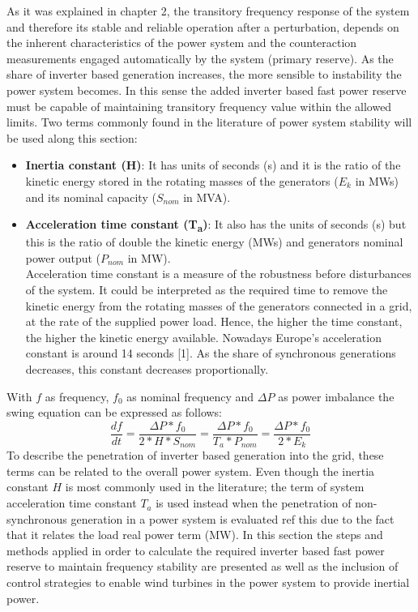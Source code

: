 As it was explained in chapter 2, the transitory frequency response of the system and therefore its stable and reliable operation after a perturbation, depends on the inherent characteristics of the power system and the counteraction measurements engaged automatically by the system (primary reserve). As the share of inverter based generation increases, the more sensible to instability the power system becomes. In this sense the added inverter based fast power reserve must be capable of maintaining transitory frequency value within the allowed limits. 
Two terms commonly found in the literature of power system stability will be used along this section:

\begin{itemize}[leftmargin=*,labelsep=5.8mm]
	\item \textbf{Inertia constant (H)}: It has units of seconds (s) and it is the ratio of the kinetic energy stored in the rotating masses of the generators ($E_k$ in MWs) and its nominal capacity ($S_{nom}$ in MVA).\\
	\item \textbf{Acceleration time constant (T\textsubscript{a})}: It also has the units of seconds (s) but this is the ratio of double the kinetic energy (MWs) and generators nominal power output ($P_{nom}$ in MW).\\
	 Acceleration time constant is a measure of the robustness before disturbances of the system. It could be interpreted as the required time to remove the kinetic energy from the rotating masses of the generators connected in a grid, at the rate of the supplied power load. Hence, the higher the time constant, the higher the kinetic energy available. Nowadays Europe’s acceleration constant is around 14 seconds [1]. As the share of synchronous generations decreases, this constant decreases proportionally.
\end{itemize}

With $f$ as frequency, $f_0$ as nominal frequency and $\Delta P$ as power imbalance the swing equation can be expressed as follows:
\begin{equation}
	\label{eq:swing}
	\frac{df}{dt}=\dfrac{\Delta P*f_0}{2*H*S_{nom}}=\frac{\Delta P*f_0}{T_a*P_{nom}}=\frac{\Delta P*f_0}{2*E_k}
\end{equation}
To describe the penetration of inverter based generation into the grid, these terms can be related to the overall power system. Even though the inertia constant $H$ is most commonly used in the literature; the term of system acceleration time constant $T_a$ is used instead when the penetration of non-synchronous generation in a power system is evaluated ref this due to the fact that it relates the load real power term (MW). 
In this section the steps and methods applied in order to calculate the required inverter based fast power reserve to maintain frequency stability are presented as well as the inclusion of control strategies to enable wind turbines in the power system to provide inertial power.

